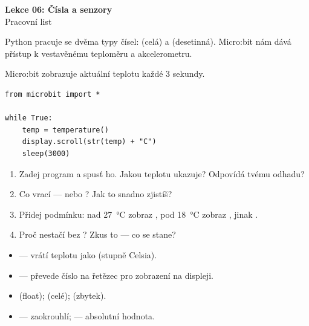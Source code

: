 \newcommand{\lekce}{Lekce 06 -- Pracovní list}




\begin{center}
  {\Large\bfseries\textcolor{microbit-blue}{Lekce 06: Čísla a senzory}}\\[4pt]
  {\large Pracovní list}
\end{center}

\medskip\noindent
Python pracuje se dvěma typy čísel:  (celá) a  (desetinná).
Micro:bit nám dává přístup k vestavěnému teploměru a akcelerometru.

\begin{ukol}[Teploměr]

Micro:bit zobrazuje aktuální teplotu každé 3 sekundy.

\begin{lstlisting}
from microbit import *

while True:
    temp = temperature()
    display.scroll(str(temp) + "C")
    sleep(3000)
\end{lstlisting}


\begin{enumerate}
  \item Zadej program a spusť ho. Jakou teplotu ukazuje? Odpovídá tvému odhadu?
  \item Co vrací  —  nebo ?
        Jak to snadno zjistíš?
  \item Přidej podmínku: nad 27~°C zobraz ,
        pod 18~°C zobraz , jinak .
  \item Proč nestačí  bez ?
        Zkus to — co se stane?
\end{enumerate}

\odpoved[2.5cm]

\begin{tcolorbox}[colback=code-bg, colframe=gray!40,
                  fonttitle=\small\bfseries, title=Čísla a převody]
  \small
  \begin{itemize}[leftmargin=*]
    \item {} — vrátí teplotu jako  (stupně Celsia).
    \item {} — převede číslo na řetězec pro zobrazení na displeji.
    \item {} (float);  (celé);  (zbytek).
    \item {} — zaokrouhlí;  — absolutní hodnota.
  \end{itemize}
\end{tcolorbox}


\end{ukol}
